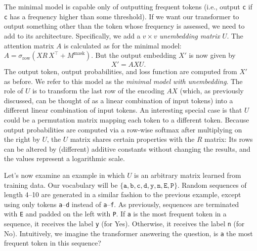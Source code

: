 \documentclass{article}
\newcommand{\ta}{\mathtt{a}}
\newcommand{\tb}{\mathtt{b}}
\newcommand{\tc}{\mathtt{c}}
\newcommand{\td}{\mathtt{d}}
\newcommand{\tn}{\mathtt{n}}
\newcommand{\ty}{\mathtt{y}}
\newcommand{\tE}{\mathtt{E}}
\newcommand{\tP}{\mathtt{P}}
\newcommand{\Tr}{^{\top}} %
\newcommand{\by}{\times}
\begin{document}
The minimal model is capable only of outputting frequent tokens
(i.e., output \texttt{c} if \texttt{c} has a frequency higher than some threshold). If we
want our transformer to output something other than the token whose frequency is assessed, we need to add to its architecture. Specifically, we add a
$v \by v$ \emph{unembedding matrix} $U$. The attention matrix $A$ is calculated as for the minimal model: 
$A = \sigma_\text{row}(X R\, X\Tr + M^\text{mask})$. But the output embedding $X'$ is now given by
\begin{displaymath}
  X' = A X U. 
\end{displaymath}
The output token, output probabilities, and loss function are computed
from $X'$ as before. We refer to this model as the \emph{minimal model
  with unembedding}. The role of $U$ is to transform the last row of
the encoding $AX$ (which, as previously discussed, can be thought of
as a linear combination of input tokens) into a different linear
combination of input tokens. An interesting special case
is that $U$ could be a permutation matrix mapping each token to a
different token. Because output probabilities are computed via a row-wise softmax after multiplying on the right by $U$, the $U$ matrix shares certain properties with the $R$ matrix: Its rows can be altered by (different) additive constants without changing the results, and the values represent a logarithmic scale.

Let's now examine an example in which $U$ is an arbitrary matrix
learned from training data.  Our vocabulary will be
$\{\ta, \tb, \tc, \td, \ty, \tn, \tE, \tP\}$. Random sequences of
length 4--10 are generated in a similar fashion to the previous
example, except using only tokens \texttt{a}--\texttt{d} instead of
\texttt{a}--\texttt{f}. As previously, sequences are terminated with
\texttt{E} and padded on the left with \texttt{P}. If \texttt{a} is
the most frequent token in a sequence, it receives the label
\texttt{y} (for Yes). Otherwise, it receives the label \texttt{n} (for
No). Intuitively, we imagine the transformer answering the question,
is \texttt{a} the most frequent token in this sequence?
\end{document}
